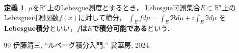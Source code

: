 \documentclass[dvipdfmx,a4paper,12pt]{jsarticle}
\theoremstyle{definition}
\newtheorem{definition}[theorem]{定義}
\begin{document}
\begin{definition}
    $\mu$を$\mathbb{R}^n$上のLebesgue測度とするとき，
    Lebesgue可測集合$E\subset \mathbb{R}^n$上の
    Lebesgue可測関数$f(x)$に対して積分，
    $\displaystyle\int_{E}fd\mu=\int_E\mathfrak{R}d\mu+i\int_E\mathfrak{I}d\mu$
    を\textbf{Lebesgue積分}といい，\textbf{$f$は$E$で積分可能である}という．
\end{definition}




\begin{thebibliography}{99}
 伊藤清三, ``ルベーグ積分入門,'' 裳華房, 2024.
\end{thebibliography}
\end{document}
